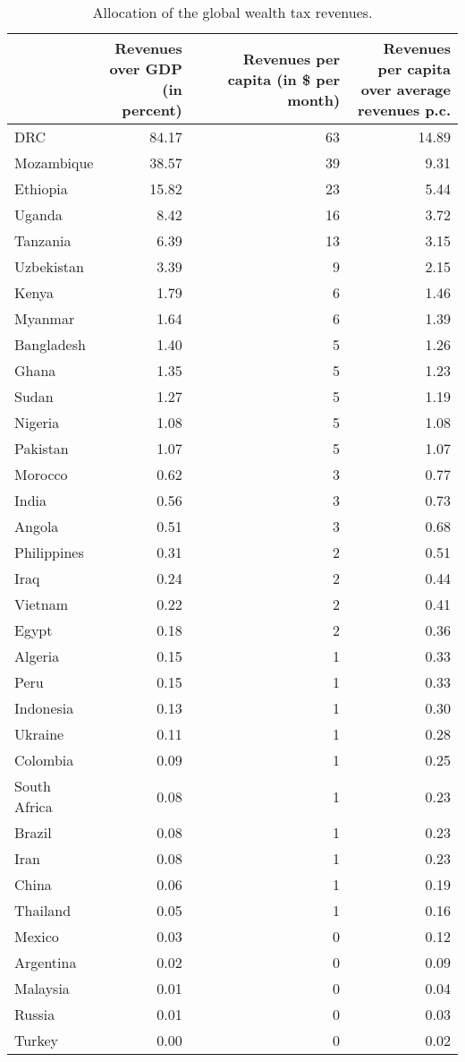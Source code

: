 
\begin{longtable}[t]{lrrr}
\caption{\label{tab:allocation.tex}Allocation of the global wealth tax revenues.}\\
\toprule
  & \makecell{Revenues\\over GDP\\(in percent)} & \makecell{Revenues\\per capita\\(in \$ per month)} & \makecell{Revenues per capita\\over average\\revenues p.c.}\\
\midrule
DRC & 84.17 & 63 & 14.89\\
Mozambique & 38.57 & 39 & 9.31\\
Ethiopia & 15.82 & 23 & 5.44\\
Uganda & 8.42 & 16 & 3.72\\
Tanzania & 6.39 & 13 & 3.15\\
Uzbekistan & 3.39 & 9 & 2.15\\
Kenya & 1.79 & 6 & 1.46\\
Myanmar & 1.64 & 6 & 1.39\\
Bangladesh & 1.40 & 5 & 1.26\\
Ghana & 1.35 & 5 & 1.23\\
Sudan & 1.27 & 5 & 1.19\\
Nigeria & 1.08 & 5 & 1.08\\
Pakistan & 1.07 & 5 & 1.07\\
Morocco & 0.62 & 3 & 0.77\\
India & 0.56 & 3 & 0.73\\
Angola & 0.51 & 3 & 0.68\\
Philippines & 0.31 & 2 & 0.51\\
Iraq & 0.24 & 2 & 0.44\\
Vietnam & 0.22 & 2 & 0.41\\
Egypt & 0.18 & 2 & 0.36\\
Algeria & 0.15 & 1 & 0.33\\
Peru & 0.15 & 1 & 0.33\\
Indonesia & 0.13 & 1 & 0.30\\
Ukraine & 0.11 & 1 & 0.28\\
Colombia & 0.09 & 1 & 0.25\\
South Africa & 0.08 & 1 & 0.23\\
Brazil & 0.08 & 1 & 0.23\\
Iran & 0.08 & 1 & 0.23\\
China & 0.06 & 1 & 0.19\\
Thailand & 0.05 & 1 & 0.16\\
Mexico & 0.03 & 0 & 0.12\\
Argentina & 0.02 & 0 & 0.09\\
Malaysia & 0.01 & 0 & 0.04\\
Russia & 0.01 & 0 & 0.03\\
Turkey & 0.00 & 0 & 0.02\\
\bottomrule
\end{longtable}